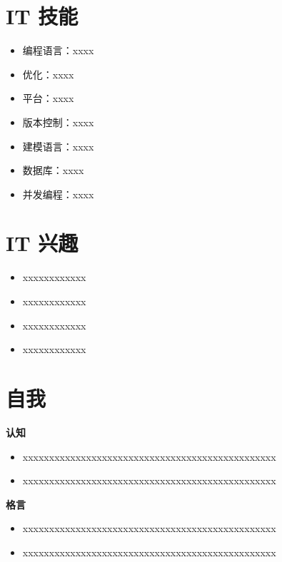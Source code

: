 \documentclass{myresume}
\begin{document}
\section{IT 技能 \faCogs}
\begin{itemize}[parsep=0.5ex]
  \item 编程语言：xxxx
  \item 优化：xxxx
  \item 平台：xxxx
  \item 版本控制：xxxx
  \item 建模语言：xxxx
  \item 数据库：xxxx
  \item 并发编程：xxxx
\end{itemize}

\bigbreak

\section{IT 兴趣 \faBug}
\begin{itemize}[parsep=0.5ex]
  \item xxxxxxxxxxxx
  \item xxxxxxxxxxxx
  \item xxxxxxxxxxxx
  \item xxxxxxxxxxxx
\end{itemize}

\bigbreak

\section{自我 \faAt}
{\textbf{认知}}
\begin{onehalfspacing}
\begin{itemize}[parsep=0.5ex]
  \item xxxxxxxxxxxxxxxxxxxxxxxxxxxxxxxxxxxxxxxxxxxxxxxx
  \item xxxxxxxxxxxxxxxxxxxxxxxxxxxxxxxxxxxxxxxxxxxxxxxx
\end{itemize}
\end{onehalfspacing}

{\textbf{格言}}
\begin{onehalfspacing}
\begin{itemize}[parsep=0.5ex]
  \item xxxxxxxxxxxxxxxxxxxxxxxxxxxxxxxxxxxxxxxxxxxxxxxx
  \item xxxxxxxxxxxxxxxxxxxxxxxxxxxxxxxxxxxxxxxxxxxxxxxx
\end{itemize}
\end{onehalfspacing}
\end{document}
